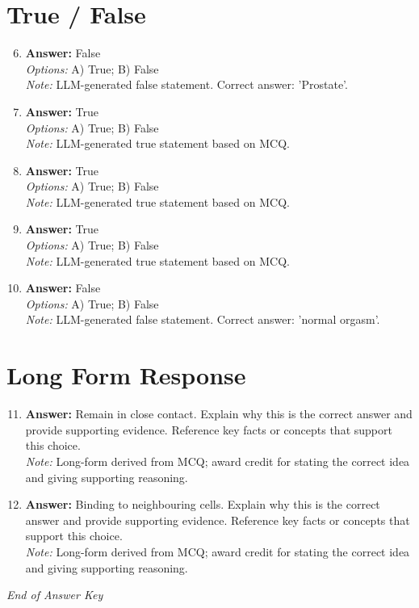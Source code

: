 \documentclass[12pt]{article}
\begin{document}
\section*{True / False}
\begin{enumerate}[label=\arabic*.]
\setcounter{enumi}{5}
\item \textbf{Answer:} False
\\ \textit{Options:} A) True; B) False
\\ \textit{Note:} LLM-generated false statement. Correct answer: 'Prostate'.
\item \textbf{Answer:} True
\\ \textit{Options:} A) True; B) False
\\ \textit{Note:} LLM-generated true statement based on MCQ.
\item \textbf{Answer:} True
\\ \textit{Options:} A) True; B) False
\\ \textit{Note:} LLM-generated true statement based on MCQ.
\item \textbf{Answer:} True
\\ \textit{Options:} A) True; B) False
\\ \textit{Note:} LLM-generated true statement based on MCQ.
\item \textbf{Answer:} False
\\ \textit{Options:} A) True; B) False
\\ \textit{Note:} LLM-generated false statement. Correct answer: 'normal orgasm'.
\end{enumerate}

\section*{Long Form Response}
\begin{enumerate}[label=\arabic*.]
\setcounter{enumi}{10}
\item \textbf{Answer:} Remain in close contact. Explain why this is the correct answer and provide supporting evidence. Reference key facts or concepts that support this choice.
\\ \textit{Note:} Long-form derived from MCQ; award credit for stating the correct idea and giving supporting reasoning.
\item \textbf{Answer:} Binding to neighbouring cells. Explain why this is the correct answer and provide supporting evidence. Reference key facts or concepts that support this choice.
\\ \textit{Note:} Long-form derived from MCQ; award credit for stating the correct idea and giving supporting reasoning.
\end{enumerate}

\vfill
\noindent\textit{End of Answer Key}
\end{document}
